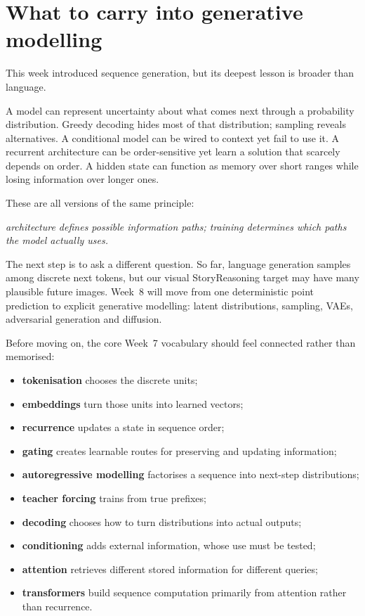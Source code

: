 \section{What to carry into generative modelling}

This week introduced sequence generation, but its deepest lesson is broader than language.

A model can represent uncertainty about what comes next through a probability distribution. Greedy decoding hides most of that distribution; sampling reveals alternatives. A conditional model can be wired to context yet fail to use it. A recurrent architecture can be order-sensitive yet learn a solution that scarcely depends on order. A hidden state can function as memory over short ranges while losing information over longer ones.

These are all versions of the same principle:
\begin{center}
\emph{architecture defines possible information paths; training determines which paths the model actually uses.}
\end{center}

The next step is to ask a different question. So far, language generation samples among discrete next tokens, but our visual StoryReasoning target may have many plausible future images. Week~8 will move from one deterministic point prediction to explicit generative modelling: latent distributions, sampling, VAEs, adversarial generation and diffusion.

Before moving on, the core Week~7 vocabulary should feel connected rather than memorised:
\begin{itemize}[leftmargin=*]
  \item \textbf{tokenisation} chooses the discrete units;
  \item \textbf{embeddings} turn those units into learned vectors;
  \item \textbf{recurrence} updates a state in sequence order;
  \item \textbf{gating} creates learnable routes for preserving and updating information;
  \item \textbf{autoregressive modelling} factorises a sequence into next-step distributions;
  \item \textbf{teacher forcing} trains from true prefixes;
  \item \textbf{decoding} chooses how to turn distributions into actual outputs;
  \item \textbf{conditioning} adds external information, whose use must be tested;
  \item \textbf{attention} retrieves different stored information for different queries;
  \item \textbf{transformers} build sequence computation primarily from attention rather than recurrence.
\end{itemize}

